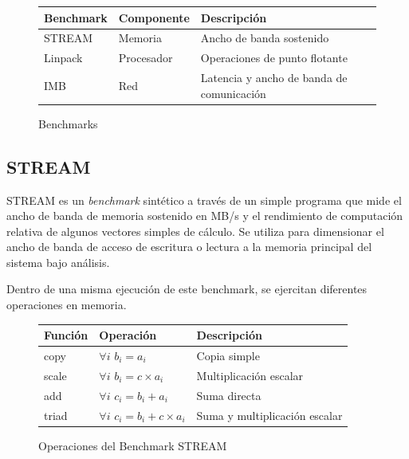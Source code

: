\documentclass[a4paper]{report}
\begin{document}
\begin{figure}[H]
  \begin{center}
    \begin{tabular}{|l|l|l|}\hline
      {\bf Benchmark} & {\bf Componente} & {\bf Descripci\'on} \\ \hline
      STREAM & Memoria & Ancho de banda sostenido \\ \hline
      Linpack & Procesador & Operaciones de punto flotante \\ \hline
      IMB & Red & Latencia y ancho de banda de comunicaci\'on \\ \hline
    \end{tabular}
    \caption{Benchmarks}
  \end{center}
  \label{benchmark-list}
\end{figure}

\subsection{STREAM}

STREAM \cite{stream} es un {\it benchmark} sint\'etico a trav\'es de un simple
programa que mide el ancho de banda de memoria sostenido en MB/s y el
rendimiento de computaci\'on relativa de algunos vectores simples de c\'alculo.
Se utiliza para dimensionar el ancho de banda de acceso de escritura o lectura
a la memoria principal del sistema bajo an\'alisis.

\bigskip

Dentro de una misma ejecuci\'on de este benchmark, se ejercitan diferentes
operaciones en memoria.

\begin{figure}[H]
  \begin{center}
    \begin{tabular}{|l|l|l|}\hline
      {\bf Funci\'on} & {\bf Operaci\'on} & {\bf Descripci\'on} \\ \hline
      copy & $ \forall i $ $ b_{i} = a_{i} $ & Copia simple \\ \hline
      scale & $ \forall i $ $ b_{i} = c \times a_{i} $ & Multiplicaci\'on escalar \\ \hline
      add & $ \forall i $ $ c_{i} = b_{i} + a_{i} $ & Suma directa \\ \hline
      triad & $ \forall i $ $ c_{i} = b_{i} + c \times a_{i} $ & Suma y multiplicaci\'on escalar \\ \hline
    \end{tabular}
    \caption{Operaciones del Benchmark STREAM}
  \end{center}
  \label{stream}
\end{figure}
\end{document}
